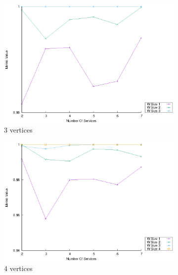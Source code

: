 \begin{figure}[!htb]
  \centering
  \begin{subfigure}{0.33\textwidth}
    \includegraphics[width=\textwidth]{Images/graphs/window_quality_performance_diff_qual_n7_s7_50_80_n3}
    \caption{3 vertices}
    \label{fig:quality_window_average_qualitative_n3}
  \end{subfigure}
  \hfill
  \begin{subfigure}{0.33\textwidth}
    \includegraphics[width=\textwidth]{Images/graphs/window_quality_performance_diff_qual_n7_s7_50_80_n4}
    \caption{4 vertices}
    \label{fig:quality_window_average_qualitative_n4}
  \end{subfigure}
  \hfill
  \begin{subfigure}{0.33\textwidth}

\end{subfigure}
\end{figure}

